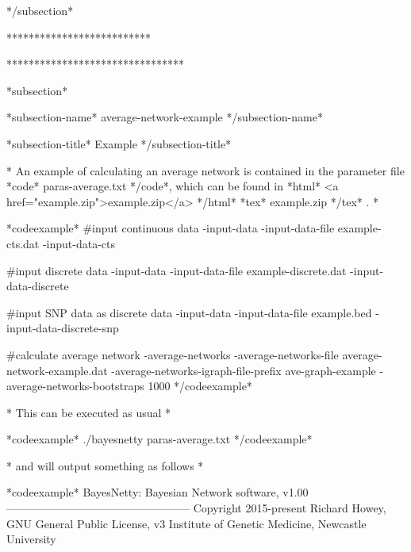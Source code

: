 */subsection*

**************************

********************************



*subsection*

*subsection-name* average-network-example */subsection-name*

*subsection-title* Example */subsection-title*

* An example of calculating an average network is contained in the parameter file *code* paras-average.txt */code*, which can be found in *html* <a href="example.zip">example.zip</a> */html* *tex* example.zip */tex* . *

*codeexample* #input continuous data -input-data -input-data-file example-cts.dat -input-data-cts

#input discrete data -input-data -input-data-file example-discrete.dat -input-data-discrete

#input SNP data as discrete data -input-data -input-data-file example.bed -input-data-discrete-snp

#calculate average network -average-networks -average-networks-file average-network-example.dat -average-networks-igraph-file-prefix ave-graph-example -average-networks-bootstraps 1000 */codeexample*

* This can be executed as usual *

*codeexample* ./bayesnetty paras-average.txt */codeexample*

* and will output something as follows *

*codeexample* BayesNetty: Bayesian Network software, v1.00 -------------------------------------------------- Copyright 2015-present Richard Howey, GNU General Public License, v3 Institute of Genetic Medicine, Newcastle University

